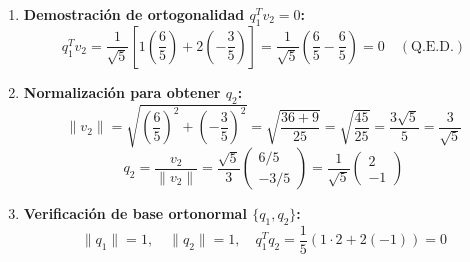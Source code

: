 \documentclass[11pt,a4paper]{article}
\theoremstyle{definition}
\theoremstyle{remark}
\begin{document}
\begin{enumerate}[leftmargin=*]
    \begin{equation}
        v_2 = a_2 - \text{proj}_{q_1}(a_2) = \begin{pmatrix} 2 \\ 1 \end{pmatrix} - \begin{pmatrix} 4/5 \\ 8/5 \end{pmatrix} = \begin{pmatrix} 6/5 \\ -3/5 \end{pmatrix}
    \end{equation}
    \item \textbf{Demostración de ortogonalidad $q_1^T v_2 = 0$:}
    \begin{equation}
        q_1^T v_2 = \frac{1}{\sqrt{5}} \left[ 1 \left(\frac{6}{5}\right) + 2 \left(-\frac{3}{5}\right) \right] = \frac{1}{\sqrt{5}} \left( \frac{6}{5} - \frac{6}{5} \right) = 0 \quad (\text{Q.E.D.})
    \end{equation}
    \item \textbf{Normalización para obtener $q_2$:}
    \begin{equation}
        \|v_2\| = \sqrt{\left(\frac{6}{5}\right)^2 + \left(-\frac{3}{5}\right)^2} = \sqrt{\frac{36+9}{25}} = \sqrt{\frac{45}{25}} = \frac{3\sqrt{5}}{5} = \frac{3}{\sqrt{5}}
    \end{equation}
    \begin{equation}
        q_2 = \frac{v_2}{\|v_2\|} = \frac{\sqrt{5}}{3} \begin{pmatrix} 6/5 \\ -3/5 \end{pmatrix} = \frac{1}{\sqrt{5}} \begin{pmatrix} 2 \\ -1 \end{pmatrix}
    \end{equation}
    \item \textbf{Verificación de base ortonormal $\{q_1, q_2\}$:}
    \begin{equation}
        \|q_1\| = 1, \quad \|q_2\| = 1, \quad q_1^T q_2 = \frac{1}{5} (1\cdot 2 + 2(-1)) = 0
    \end{equation}
\end{enumerate}
\end{document}
